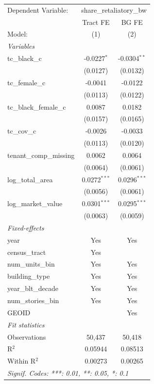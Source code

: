 \par\endgroup
\begingroup
\centering
\begin{tabular}{lcc}
   \tabularnewline \midrule \midrule
   Dependent Variable: & \multicolumn{2}{c}{share\_retaliatory\_bw}\\
                           & Tract FE       & BG FE \\   
   Model:                  & (1)            & (2)\\  
   \midrule
   \emph{Variables}\\
   tc\_black\_c            & -0.0227$^{*}$  & -0.0304$^{**}$\\   
                           & (0.0127)       & (0.0132)\\   
   tc\_female\_c           & -0.0041        & -0.0122\\   
                           & (0.0113)       & (0.0122)\\   
   tc\_black\_female\_c    & 0.0087         & 0.0182\\   
                           & (0.0157)       & (0.0165)\\   
   tc\_cov\_c              & -0.0026        & -0.0033\\   
                           & (0.0113)       & (0.0120)\\   
   tenant\_comp\_missing   & 0.0062         & 0.0064\\   
                           & (0.0064)       & (0.0061)\\   
   log\_total\_area        & 0.0272$^{***}$ & 0.0296$^{***}$\\   
                           & (0.0056)       & (0.0061)\\   
   log\_market\_value      & 0.0301$^{***}$ & 0.0295$^{***}$\\   
                           & (0.0063)       & (0.0059)\\   
   \midrule
   \emph{Fixed-effects}\\
   year                    & Yes            & Yes\\  
   census\_tract           & Yes            & \\  
   num\_units\_bin         & Yes            & Yes\\  
   building\_type          & Yes            & Yes\\  
   year\_blt\_decade       & Yes            & Yes\\  
   num\_stories\_bin       & Yes            & Yes\\  
   GEOID                   &                & Yes\\  
   \midrule
   \emph{Fit statistics}\\
   Observations            & 50,437         & 50,418\\  
   R$^2$                   & 0.05944        & 0.08513\\  
   Within R$^2$            & 0.00273        & 0.00265\\  
   \midrule \midrule
   \multicolumn{3}{l}{\emph{Signif. Codes: ***: 0.01, **: 0.05, *: 0.1}}\\
\end{tabular}
\par\endgroup
